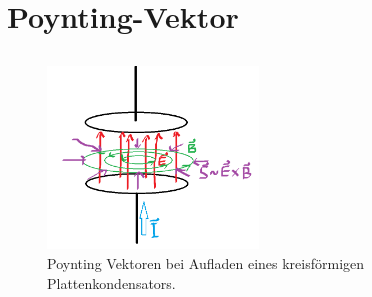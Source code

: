 \documentclass[11pt]{article}
\begin{document}
\section{Poynting-Vektor}
\subsection{}
\begin{figure}[h]
    \centering
    \includegraphics[width=0.5\textwidth]{F1.png}
    \begin{adjustwidth}{20pt}{}
        \caption{Poynting Vektoren bei Aufladen eines kreisförmigen Plattenkondensators.}
    \end{adjustwidth}
\end{figure}
\end{document}
